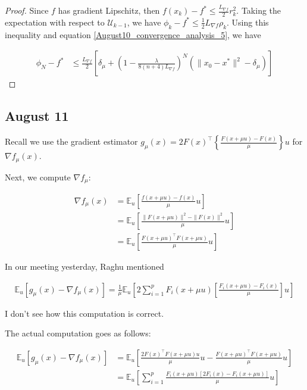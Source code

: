 \documentclass{article}
\begin{document}
\begin{theorem}
\begin{proof}
Since $f$ has gradient Lipschitz, then $f(x_k) - f^* \leq \frac{L_{\nabla f}}{2}r_k^2$. Taking the expectation with respect to $\mathcal{U}_{k-1}$, we have $\phi_k - f^* \leq \frac{1}{2}L_{\nabla f}\rho_k$. Using this inequality and equation \eqref{August10_convergence_analysis_5}, we have 

\begin{align*}
\phi_N - f^* & \leq \frac{L_{\nabla f}}{2}\left[\delta_{\mu} + \left(1 - \frac{\lambda}{8(n+4)L_{\nabla f}}\right)^N(\|x_0 - x^*\|^2 - \delta_{\mu})\right]
\end{align*}

\end{proof}
\end{theorem}

\subsection{August 11}

Recall we use the gradient estimator $g_{\mu}(x) = 2F(x)^\top\left\{\frac{F(x+\mu u)-F(x)}{\mu}\right\}u$ for $\nabla f_{\mu}(x)$. \newline 

Next, we compute $\nabla f_{\mu}$:

\begin{align*}
\nabla f_{\mu}(x) & = \mathbb{E}_u\left[\frac{f(x+\mu u) - f(x)}{\mu}u\right] \\ & = \mathbb{E}_u\left[\frac{\|F(x+\mu u)\|^2 - \|F(x)\|^2}{\mu}u\right] \\ & = \mathbb{E}_u\left[\frac{F(x+\mu u)^\top F(x+ \mu u)}{\mu}u\right]
\end{align*}

In our meeting yesterday, Raghu mentioned 

\begin{align*}
\mathbb{E}_u[g_{\mu}(x) - \nabla f_{\mu}(x)] = \frac{1}{\mu}\mathbb{E}_u\left[2\sum_{i=1}^pF_i(x+\mu u)\left[\frac{F_i(x+\mu u)-F_i(x)}{\mu}\right]u\right]
\end{align*}

I don't see how this computation is correct. \newline 

The actual computation goes as follows: 

\begin{align*}
\mathbb{E}_u\left[g_{\mu}(x) - \nabla f_{\mu}(x)\right] & = \mathbb{E}_u\left[\frac{2F(x)^\top F(x+\mu u)u}{\mu}u - \frac{F(x+\mu u)^\top F(x+\mu u)}{\mu} u\right] \\ & = \mathbb{E}_u\left[\sum_{i=1}^p\frac{F_i(x+\mu u)[2F_i(x) - F_i(x+\mu u)]}{\mu}u\right]
\end{align*}
\end{document}
